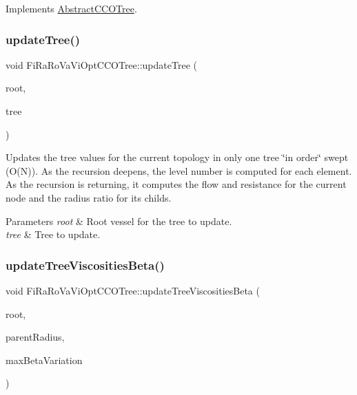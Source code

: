 Implements \mbox{\hyperlink{class_abstract_c_c_o_tree}{Abstract\+C\+C\+O\+Tree}}.

\mbox{\label{class_fi_ra_ro_va_vi_opt_c_c_o_tree_ac0905b566762939a0ea67a2fa0ae1133}} 
\subsubsection{\texorpdfstring{update\+Tree()}{updateTree()}}
{\footnotesize\ttfamily void Fi\+Ra\+Ro\+Va\+Vi\+Opt\+C\+C\+O\+Tree\+::update\+Tree (\begin{DoxyParamCaption}\item[{\mbox{\hyperlink{structvessel}{vessel}} $\ast$}]{root,  }\item[{\mbox{\hyperlink{class_fi_ra_ro_va_vi_opt_c_c_o_tree}{Fi\+Ra\+Ro\+Va\+Vi\+Opt\+C\+C\+O\+Tree}} $\ast$}]{tree }\end{DoxyParamCaption})\hspace{0.3cm}{\ttfamily [private]}}

Updates the tree values for the current topology in only one tree \char`\"{}in order\char`\"{} swept (O(\+N)). As the recursion deepens, the level number is computed for each element. As the recursion is returning, it computes the flow and resistance for the current node and the radius ratio for its childs. 
\begin{DoxyParams}{Parameters}
{\em root} & Root vessel for the tree to update. \\
\hline
{\em tree} & Tree to update. \\
\hline
\end{DoxyParams}
\mbox{\label{class_fi_ra_ro_va_vi_opt_c_c_o_tree_a52979a09656d9a35d340702e54d0863e}} 
\subsubsection{\texorpdfstring{update\+Tree\+Viscosities\+Beta()}{updateTreeViscositiesBeta()}}
{\footnotesize\ttfamily void Fi\+Ra\+Ro\+Va\+Vi\+Opt\+C\+C\+O\+Tree\+::update\+Tree\+Viscosities\+Beta (\begin{DoxyParamCaption}\item[{\mbox{\hyperlink{structvessel}{vessel}} $\ast$}]{root,  }\item[{double}]{parent\+Radius,  }\item[{double $\ast$}]{max\+Beta\+Variation }\end{DoxyParamCaption})\hspace{0.3cm}{\ttfamily [private]}}

